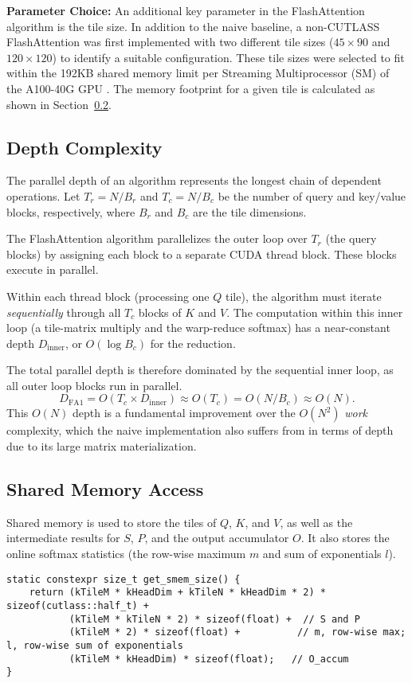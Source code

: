 \documentclass[11pt]{article}
\renewcommand\cite{\citep}  %
\begin{document}
\textbf{Parameter Choice:} An additional key parameter in the FlashAttention algorithm is the tile size. In addition to the naive baseline, a non-CUTLASS FlashAttention was first implemented with two different tile sizes ($45 \times 90$ and $120 \times 120$) to identify a suitable configuration. These tile sizes were selected to fit within the 192KB shared memory limit per Streaming Multiprocessor (SM) of the A100-40G GPU \cite{nvidia2022a100}. The memory footprint for a given tile is calculated as shown in Section~\ref{sec:mem-acc}.

\subsection{Depth Complexity}

The parallel depth of an algorithm represents the longest chain of dependent operations. Let $T_r = N / B_r$ and $T_c = N / B_c$ be the number of query and key/value blocks, respectively, where $B_r$ and $B_c$ are the tile dimensions.

The FlashAttention algorithm parallelizes the outer loop over $T_r$ (the query blocks) by assigning each block to a separate CUDA thread block. These blocks execute in parallel.

Within each thread block (processing one $Q$ tile), the algorithm must iterate \textit{sequentially} through all $T_c$ blocks of $K$ and $V$. The computation within this inner loop (a tile-matrix multiply and the warp-reduce softmax) has a near-constant depth $D_{\text{inner}}$, or $O(\log B_c)$ for the reduction.

The total parallel depth is therefore dominated by the sequential inner loop, as all outer loop blocks run in parallel.
\[
D_{\text{FA1}} = O(T_c \times D_{\text{inner}}) \approx O(T_c) = O(N / B_c) \approx O(N).
\]
This $O(N)$ depth is a fundamental improvement over the $O(N^2)$ \textit{work} complexity, which the naive implementation also suffers from in terms of depth due to its large matrix materialization.

\subsection{Shared Memory Access}
\label{sec:mem-acc}

Shared memory is used to store the tiles of $Q$, $K$, and $V$, as well as the intermediate results for $S$, $P$, and the output accumulator $O$. It also stores the online softmax statistics (the row-wise maximum $m$ and sum of exponentials $l$).
\begin{lstlisting}
static constexpr size_t get_smem_size() {
    return (kTileM * kHeadDim + kTileN * kHeadDim * 2) * sizeof(cutlass::half_t) +
           (kTileM * kTileN * 2) * sizeof(float) +  // S and P
           (kTileM * 2) * sizeof(float) +          // m, row-wise max; l, row-wise sum of exponentials
           (kTileM * kHeadDim) * sizeof(float);   // O_accum
}
\end{lstlisting}
\end{document}
